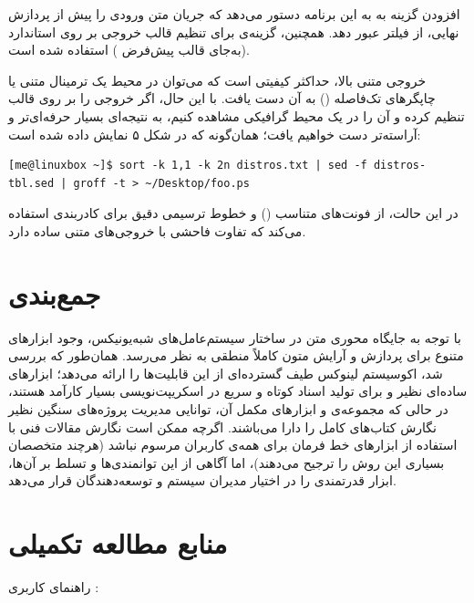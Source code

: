 افزودن گزینه  به  به این برنامه دستور می‌دهد که جریان متن ورودی را پیش از پردازش نهایی، از فیلتر  عبور دهد. همچنین، گزینه‌ی  برای تنظیم قالب خروجی بر روی استاندارد  (به‌جای قالب پیش‌فرض ) استفاده شده است.

خروجی متنی بالا، حداکثر کیفیتی است که می‌توان در محیط یک ترمینال متنی یا چاپگرهای تک‌فاصله () به آن دست یافت. با این حال، اگر خروجی را بر روی قالب  تنظیم کرده و آن را در یک محیط گرافیکی مشاهده کنیم، به نتیجه‌ای بسیار حرفه‌ای‌تر و آراسته‌تر دست خواهیم یافت؛ همان‌گونه که در شکل ۵ نمایش داده شده است:

\begin{latin}
\begin{lstlisting}
[me@linuxbox ~]$ sort -k 1,1 -k 2n distros.txt | sed -f distros-tbl.sed | groff -t > ~/Desktop/foo.ps
\end{lstlisting}
\end{latin}


در این حالت،  از فونت‌های متناسب () و خطوط ترسیمی دقیق برای کادربندی استفاده می‌کند که تفاوت فاحشی با خروجی‌های متنی ساده دارد.

\section{جمع‌بندی}

با توجه به جایگاه محوری متن در ساختار سیستم‌عامل‌های شبه‌یونیکس، وجود ابزارهای متنوع برای پردازش و آرایش متون کاملاً منطقی به نظر می‌رسد. همان‌طور که بررسی شد، اکوسیستم لینوکس طیف گسترده‌ای از این قابلیت‌ها را ارائه می‌دهد؛ ابزارهای ساده‌ای نظیر  و  برای تولید اسناد کوتاه و سریع در اسکریپت‌نویسی بسیار کارآمد هستند، در حالی که مجموعه‌ی  و ابزارهای مکمل آن، توانایی مدیریت پروژه‌های سنگین نظیر نگارش کتاب‌های کامل را دارا می‌باشند. اگرچه ممکن است نگارش مقالات فنی با استفاده از ابزارهای خط فرمان برای همه‌ی کاربران مرسوم نباشد (هرچند متخصصان بسیاری این روش را ترجیح می‌دهند)، اما آگاهی از این توانمندی‌ها و تسلط بر آن‌ها، ابزار قدرتمندی را در اختیار مدیران سیستم و توسعه‌دهندگان قرار می‌دهد.

\section{منابع مطالعه تکمیلی}

راهنمای کاربری :

